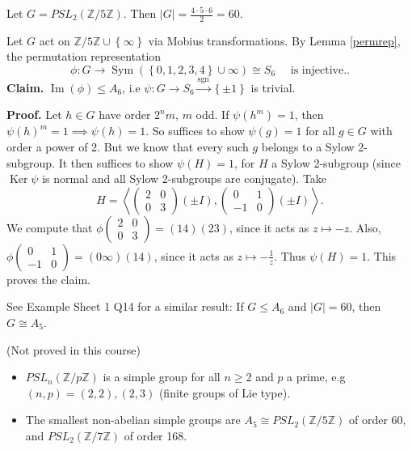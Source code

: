 \documentclass[egregdoesnotlikesansseriftitles,a4paper]{scrartcl}
\begin{document}
\begin{example*}
      Let $G=PSL_2 (\mathbb{Z}/5\mathbb{Z})$. Then $|G|= \frac{4 \cdot 5 \cdot  6}{2}=60$. 
      
      Let $G$ act on $\mathbb{Z}/5\mathbb{Z} \cup \left\{ \infty\right\}$ via Mobius transformations. By Lemma \ref{permrep}, the permutation representation \[
      \phi: G \rightarrow \operatorname{Sym}(\left\{0,1,2,3,4\right\}\cup \infty) \cong S_{6} \quad  \text{ is injective.}
      .\]
      \textbf{Claim.} $\operatorname{Im} (\phi) \leq A_6 $, i.e $\psi: G \rightarrow S_6 \xrightarrow{\operatorname{sgn}} \left\{\pm 1\right\}$ is trivial. 
      
      \textbf{Proof.} Let $h \in G$ have order $2^{n}m$, $m$ odd. If $\psi (h^{m})=1$, then $\psi (h)^{m}=1 \implies \psi (h)=1$. So suffices to show $\psi (g)=1$ for all $g \in G$ with order a power of 2. But we know that every such $g$ belongs to a Sylow 2-subgroup. It then suffices to show $\psi (H)=1$, for $H$ a Sylow 2-subgroup (since $\operatorname{Ker} \psi$ is normal and all Sylow 2-subgroups are conjugate). Take \[
          H=\left\langle \begin{pmatrix} 2&0\\0&3 \end{pmatrix}(\pm I),\begin{pmatrix} 0&1\\-1&0 \end{pmatrix} (\pm I)\right\rangle
      .\] We compute that $\phi \begin{pmatrix} 2&0\\0&3 \end{pmatrix}= (14)(23)$, since it acts as $z \mapsto -z$. Also, $\phi \begin{pmatrix} 0&1\\-1&0 \end{pmatrix}= (0 \infty)(14)$, since it acts as $z \mapsto -\frac{1}{z}$. Thus $\psi (H)=1$. This proves the claim. 

      See Example Sheet 1 Q14 for a similar result: If $G \leq A_6 $ and $|
      G|=60$, then $G \cong A_5 $.
\end{example*}
\begin{remarks}
      (Not proved in this course)\hfill 
      \begin{itemize}
           \item $PSL_n (\mathbb{Z}/p\mathbb{Z})$ is a simple group for all $n \geq 2$ and $p$ a prime, e.g $(n,p)=(2,2), (2,3)$ (finite groups of Lie type). 
           \item The smallest non-abelian simple groups are $A_5 \cong PSL_2 (\mathbb{Z}/5\mathbb{Z})$ of order 60, and $PSL_2 (\mathbb{Z}/7\mathbb{Z})$ of order 168.
      \end{itemize}
\end{remarks}
\end{document}
